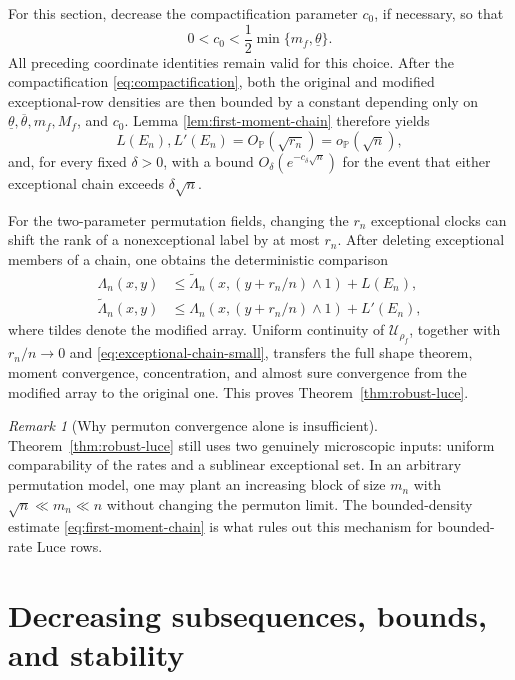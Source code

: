 \documentclass[11pt]{article}
\theoremstyle{remark}
\newtheorem{remark}[theorem]{Remark}
\newcommand{\Pp}{\mathbb P}
\newcommand{\calU}{\mathcal U}
\begin{document}
For this section, decrease the compactification parameter $c_0$, if necessary,
so that
\[
        0<c_0<\frac12\min\{m_f,\underline\theta\}.
\]
All preceding coordinate identities remain valid for this choice.  After the
compactification \eqref{eq:compactification}, both the original and modified
exceptional-row densities are then bounded by a constant depending only on
$\underline\theta,\overline\theta,m_f,M_f$, and $c_0$.  Lemma
\ref{lem:first-moment-chain} therefore yields
\begin{equation}\label{eq:exceptional-chain-small}
        L(E_n),L'(E_n)=O_{\Pp}(\sqrt{r_n})
        =o_{\Pp}(\sqrt n),
\end{equation}
and, for every fixed $\delta>0$, with a bound
$O_\delta(e^{-c_\delta\sqrt n})$ for the event that either exceptional
chain exceeds $\delta\sqrt n$.

For the two-parameter permutation fields, changing the $r_n$ exceptional
clocks can shift the rank of a nonexceptional label by at most $r_n$.  After
deleting exceptional members of a chain, one obtains the deterministic
comparison
\begin{align}
 \Lambda_n(x,y)
 &\le \widetilde\Lambda_n
       \left(x,(y+r_n/n)\wedge1\right)+L(E_n),
 \label{eq:robust-field-upper}\\
 \widetilde\Lambda_n(x,y)
 &\le \Lambda_n
       \left(x,(y+r_n/n)\wedge1\right)+L'(E_n),
 \label{eq:robust-field-lower}
\end{align}
where tildes denote the modified array.  Uniform continuity of
$\calU_{\rho_f}$, together with $r_n/n\to0$ and
\eqref{eq:exceptional-chain-small}, transfers the full shape theorem,
moment convergence, concentration, and almost sure convergence from the
modified array to the original one.  This proves
Theorem~\ref{thm:robust-luce}.

\begin{remark}[Why permuton convergence alone is insufficient]
Theorem~\ref{thm:robust-luce} still uses two genuinely microscopic inputs:
uniform comparability of the rates and a sublinear exceptional set.  In an
arbitrary permutation model, one may plant an increasing block of size
$m_n$ with $\sqrt n\ll m_n\ll n$ without changing the permuton limit.  The
bounded-density estimate \eqref{eq:first-moment-chain} is what rules out this
mechanism for bounded-rate Luce rows.
\end{remark}

\section{Decreasing subsequences, bounds, and stability}\label{sec:consequences}
\end{document}
